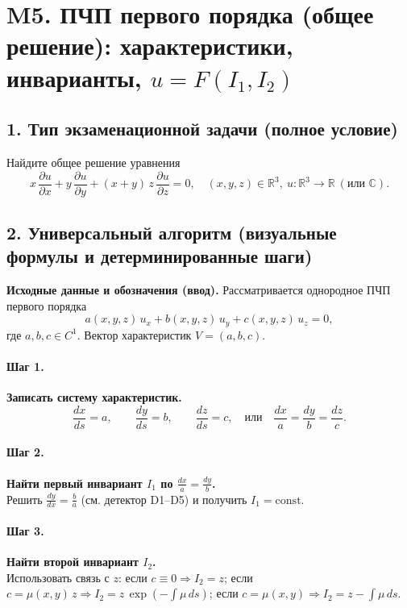 \section{M5. ПЧП первого порядка (общее решение): характеристики, инварианты, \(u=F(I_1,I_2)\)}

\subsection*{1. Тип экзаменационной задачи (полное условие)}
Найдите общее решение уравнения
\[
x\,\frac{\partial u}{\partial x} + y\,\frac{\partial u}{\partial y} + (x+y)\,z\,\frac{\partial u}{\partial z}=0,
\quad (x,y,z)\in\mathbb R^3,\ u:\mathbb R^3\to\mathbb R\ (\text{или }\mathbb C).
\]

\subsection*{2. Универсальный алгоритм (визуальные формулы и детерминированные шаги)}

\textbf{Исходные данные и обозначения (ввод).}
Рассматривается однородное ПЧП первого порядка
\[
a(x,y,z)\,u_x + b(x,y,z)\,u_y + c(x,y,z)\,u_z = 0,
\]
где \(a,b,c\in C^1\). Вектор характеристик \(V=(a,b,c)\).

\paragraph{Шаг 1.} \textbf{Записать систему характеристик.}\\
\[
\frac{dx}{ds}=a,\qquad \frac{dy}{ds}=b,\qquad \frac{dz}{ds}=c,
\quad\text{или}\quad \frac{dx}{a}=\frac{dy}{b}=\frac{dz}{c}.
\]

\paragraph{Шаг 2.} \textbf{Найти первый инвариант \(I_1\) по \(\frac{dx}{a}=\frac{dy}{b}\).}\\
Решить \(\displaystyle \frac{dy}{dx}=\frac{b}{a}\) (см. детектор D1--D5) и получить \(I_1=\text{const}\).

\paragraph{Шаг 3.} \textbf{Найти второй инвариант \(I_2\).}\\
Использовать связь с \(z\): если \(c\equiv0\Rightarrow I_2=z\); если \(c=\mu(x,y)\,z\Rightarrow I_2=z\,\exp(-\int \mu\,ds)\); если \(c=\mu(x,y)\Rightarrow I_2=z-\int \mu\,ds\).

